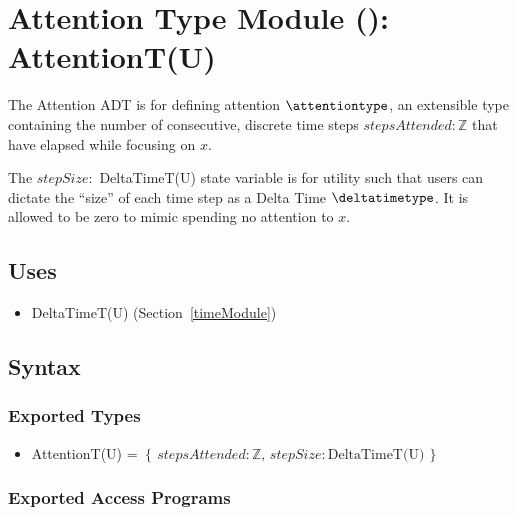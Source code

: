 \section{Attention Type Module ():
AttentionT(U)}\label{attentionModule}

The Attention ADT is for defining attention  $\attentiontype$, an extensible
type containing the number of consecutive, discrete time steps
$\mathit{stepsAttended} : \mathbb{Z}$ that have elapsed while focusing on $x$.

The $\mathit{stepSize} : $ DeltaTimeT(U) state variable is for utility such
that users can dictate the ``size'' of each time step as a Delta Time
$\deltatimetype$. It is allowed to be zero to mimic spending no attention to
$x$.

\subsection{Uses}
\begin{itemize}[noitemsep, nosep]

    \item DeltaTimeT(U) (Section~\ref{timeModule})

\end{itemize}

\subsection{Syntax}

\subsubsection{Exported Types}
\begin{itemize}

    \item AttentionT(U) = $\left\{ \, \mathit{stepsAttended} : \mathbb{Z}, \,
    \mathit{stepSize} : \text{DeltaTimeT(U)} \, \right\} $

\end{itemize}

\subsubsection{Exported Access Programs}

